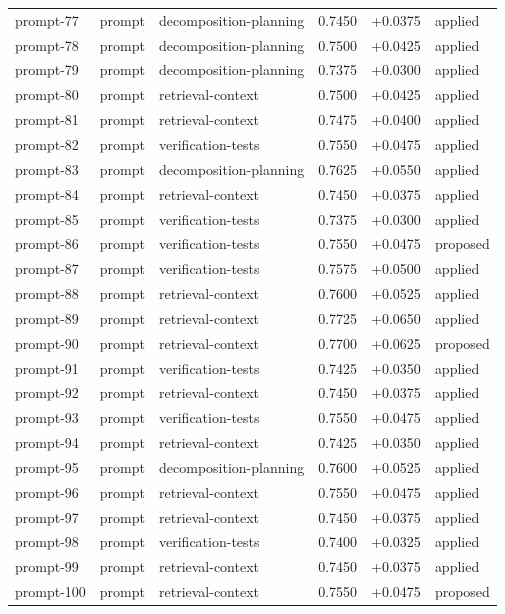 \begin{center}
\begin{longtable}{llp{5.2cm}rrl}
prompt-77 & prompt & decomposition-planning & 0.7450 & +0.0375 & applied \\
prompt-78 & prompt & decomposition-planning & 0.7500 & +0.0425 & applied \\
prompt-79 & prompt & decomposition-planning & 0.7375 & +0.0300 & applied \\
prompt-80 & prompt & retrieval-context & 0.7500 & +0.0425 & applied \\
prompt-81 & prompt & retrieval-context & 0.7475 & +0.0400 & applied \\
prompt-82 & prompt & verification-tests & 0.7550 & +0.0475 & applied \\
prompt-83 & prompt & decomposition-planning & 0.7625 & +0.0550 & applied \\
prompt-84 & prompt & retrieval-context & 0.7450 & +0.0375 & applied \\
prompt-85 & prompt & verification-tests & 0.7375 & +0.0300 & applied \\
prompt-86 & prompt & verification-tests & 0.7550 & +0.0475 & proposed \\
prompt-87 & prompt & verification-tests & 0.7575 & +0.0500 & applied \\
prompt-88 & prompt & retrieval-context & 0.7600 & +0.0525 & applied \\
prompt-89 & prompt & retrieval-context & 0.7725 & +0.0650 & applied \\
prompt-90 & prompt & retrieval-context & 0.7700 & +0.0625 & proposed \\
prompt-91 & prompt & verification-tests & 0.7425 & +0.0350 & applied \\
prompt-92 & prompt & retrieval-context & 0.7450 & +0.0375 & applied \\
prompt-93 & prompt & verification-tests & 0.7550 & +0.0475 & applied \\
prompt-94 & prompt & retrieval-context & 0.7425 & +0.0350 & applied \\
prompt-95 & prompt & decomposition-planning & 0.7600 & +0.0525 & applied \\
prompt-96 & prompt & retrieval-context & 0.7550 & +0.0475 & applied \\
prompt-97 & prompt & retrieval-context & 0.7450 & +0.0375 & applied \\
prompt-98 & prompt & verification-tests & 0.7400 & +0.0325 & applied \\
prompt-99 & prompt & retrieval-context & 0.7450 & +0.0375 & applied \\
prompt-100 & prompt & retrieval-context & 0.7550 & +0.0475 & proposed \\
\bottomrule\end{longtable}\end{center}
\clearpage
